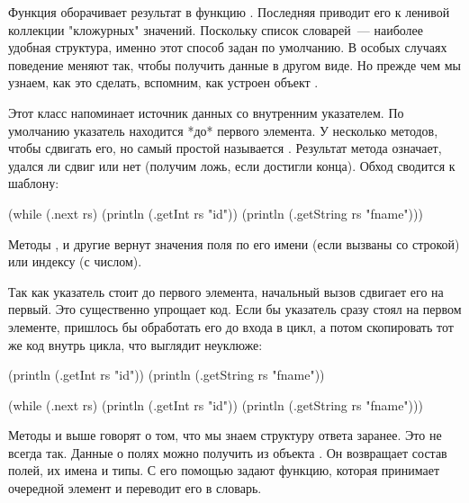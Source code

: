 Функция  оборачивает результат  в функцию . Последняя приводит его к ленивой коллекции "кложурных" значений. Поскольку список словарей~--- наиболее удобная структура, именно этот способ задан по умолчанию. В особых случаях поведение  меняют так, чтобы получить данные в другом виде. Но прежде чем мы узнаем, как это сделать, вспомним, как устроен объект .

Этот класс напоминает источник данных со внутренним указателем. По умолчанию указатель находится *до* первого элемента. У  несколько методов, чтобы сдвигать его, но самый простой называется . Результат метода означает, удался ли сдвиг или нет (получим ложь, если достигли конца). Обход  сводится к шаблону:

\begin{english}
  \begin{clojure}
(while (.next rs)
  (println (.getInt rs "id"))
  (println (.getString rs "fname")))
  \end{clojure}
\end{english}

Методы ,  и другие вернут значения поля по его имени (если вызваны со строкой) или индексу (с числом).

Так как указатель стоит до первого элемента, начальный вызов  сдвигает его на первый. Это существенно упрощает код. Если бы указатель сразу стоял на первом элементе, пришлось бы обработать его до входа в цикл, а потом скопировать тот же код внутрь цикла, что выглядит неуклюже:

\begin{english}
  \begin{clojure}
(println (.getInt rs "id"))
(println (.getString rs "fname"))

(while (.next rs)
  (println (.getInt rs "id"))
  (println (.getString rs "fname")))
  \end{clojure}
\end{english}

Методы  и  выше говорят о том, что мы знаем структуру ответа заранее. Это не всегда так. Данные о полях можно получить из объекта . Он возвращает состав полей, их имена и типы. С его помощью задают функцию, которая принимает очередной элемент  и переводит его в словарь.

\def\urlrssrs{https://github.com/clojure/clojure/blob/clojure-1.10.1/src/clj/clojure/core.clj\#L5702}

